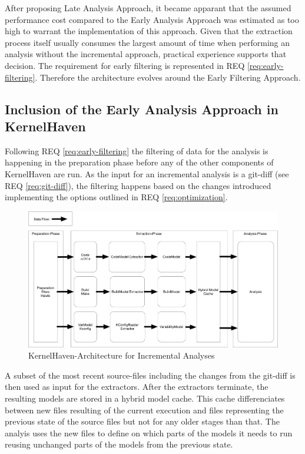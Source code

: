 \documentclass[a4paper]{article}
\begin{document}
After proposing Late Analysis Approach, it became apparant that the assumed performance cost compared to the Early Analysis Approach was estimated as too high to warrant the implementation of this approach. Given that the extraction process itself usually consumes the largest amount of time when performing an analysis without the incremental approach, practical experience supports that decision. The requirement for early filtering is represented in REQ \ref{req:early-filtering}. Therefore the architecture evolves around the Early Filtering Approach.

\subsection{Inclusion of the Early Analysis Approach in KernelHaven}

Following REQ \ref{req:early-filtering} the filtering of data for the analysis is happening in the preparation phase before any of the other components of KernelHaven are run. As the input for an incremental analysis is a git-diff (see REQ \ref{req:git-diff}), the filtering happens based on the changes introduced implementing the options outlined in REQ \ref{req:optimization}.

\begin{figure}[htbp] 
  \centering
  \begin{minipage}[b]{1\textwidth} 
    \caption[KernelHaven-Architecture-Incremental]{KernelHaven-Architecture for Incremental Analyses}\label{fig:KernelHaven-Architecture-Incremental}
    \includegraphics[width=1\textwidth]{img/KernelHavenIncremental.pdf}
  \end{minipage}
\end{figure}

A subset of the most recent source-files including the changes from the git-diff is then used as input for the extractors. After the extractors terminate, the resulting models are stored in a hybrid model cache. This cache differenciates between new files resulting of the current execution and files representing the previous state of the source files but not for any older stages than that. The analyis uses the new files to define on which parts of the models it needs to run reusing unchanged parts of the models from the previous state.
\end{document}
